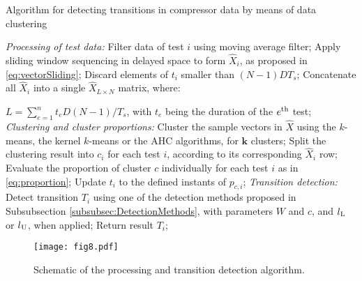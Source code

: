 \documentclass[preprint,11pt,number]{elsarticle}
\begin{document}
\begin{algorithm}[htb]
\caption{\small{Algorithm for detecting transitions in compressor data by means of data clustering}} \label{alg:pseudoCode}
\begin{algorithmic}[1]
 \vspace{5pt}
 \Statex \textit{Processing of test data:}
     \State Filter data of test $i$ using moving average filter;
     \State Apply sliding window sequencing in delayed space to form $\hat{X}_i$, as proposed in \eqref{eq:vectorSliding};
     \State Discard elements of $t_i$ smaller than $(N-1)DT_s$;
\EndFor
\State Concatenate all $\hat{X}_i$ into a single $\hat{X}_{L\times N}$ matrix, where: 

$L = \sum_{e=1}^{n} t_e D(N-1)/T_s$, with $t_e$ being the duration of the $e\textsuperscript{th}$ test;
 \vspace{5pt} 
  \Statex \textit{Clustering and cluster proportions:}
 \State Cluster the sample vectors in $\hat{X}$ using the $k$-means, the kernel $k$-means or the AHC algorithms, for $\bm{k}$ clusters;
 \State Split the clustering result into $c_i$ for each test $i$, according to its corresponding $\hat{X}_i$ row;
    \State Evaluate the proportion of cluster $c$ individually for each test $i$ as in \eqref{eq:proportion};
    \State Update $t_i$ to the defined instants of $p_{c,i}$;
 \vspace{5pt} 
 \Statex \textit{Transition detection:}
     \State Detect transition $T_i$ using one of the detection methods proposed in Subsubsection \ref{subsubsec:DetectionMethods}, with parameters $W$ and $c$, and $l\textsubscript{L}$ or $l\textsubscript{U}$, when applied;
    \State Return result $T_i$;
\EndFor
\end{algorithmic}
\end{algorithm}

\begin{figure}[htb]
\begin{center}
\texttt{[image: fig8.pdf]}    %
\color{red}
\caption{Schematic of the processing and transition detection algorithm.}
\label{fig:algorithm}
\end{center}
\end{figure}
\end{document}
